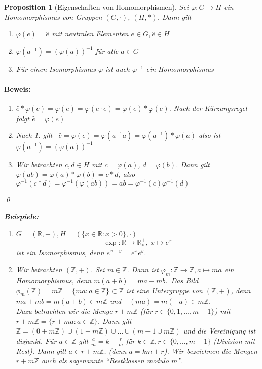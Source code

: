 \documentclass{report}
\newcommand{\R}{\mathbb{R}}
\newcommand{\Z}{\mathbb{Z}}
\theoremstyle{customrem}
\theoremstyle{customdef}
\newtheorem{proposition}[definition]{Proposition}
\renewenvironment{proof}{\paragraph{Beweis: }}{\qed}
\theoremstyle{customenv}
\begin{document}
	\begin{proposition}[Eigenschaften von Homomorphismen]
		Sei \(\varphi : G \to H\) ein Homomorphismus von Gruppen \((G, \cdot)\), \((H, \ast)\). Dann gilt
		\begin{enumerate}
			\itemsep0cm
			\item \(\varphi(e) = \hat{e}\) mit neutralen Elementen \(e \in G, \hat{e} \in H\)
			\item \(\varphi(a^{-1}) = (\varphi(a))^{-1}\) für alle \(a \in G\)
			\item Für einen Isomorphismus \(\varphi\) ist auch \(\varphi^{-1}\) ein Homomorphismus
		\end{enumerate}
		\begin{proof}
			\begin{enumerate}
				\item \(\hat{e} * \varphi(e) = \varphi(e) = \varphi(e \cdot e) = \varphi(e) * \varphi(e)\). Nach der Kürzungsregel folgt \(\hat{e} = \varphi(e)\)
				\item Nach 1. gilt \ \(\hat{e} = \varphi(e) = \varphi(a^{-1} a) = \varphi(a^{-1}) * \varphi(a)\) also ist \(\varphi(a^{-1}) = (\varphi(a))^{-1}\)
				\item Wir betrachten \(c, d \in H\) mit \(c = \varphi(a)\), \(d = \varphi(b)\). Dann gilt \(\varphi(a b) = \varphi(a) * \varphi(b) = c * d\), also \(\varphi^{-1}(c * d) = \varphi^{-1}(\varphi(a b)) = ab = \varphi^{-1}(c) \varphi^{-1}(d)\)
			\end{enumerate}
		\end{proof}

		\textbf{Beispiele:}
		\begin{enumerate}
			\item \(G = (\R, +), H = (\{x \in \R : x > 0\}, \cdot)\)
			\[\exp : \R \to \R^+_*,\ x \mapsto e^x\]
			ist ein Isomorphismus, denn \(e^{x + y} = e^x e^y\).
			\item Wir betrachten \((\Z, +)\). Sei \(m \in \Z\). Dann ist \(\varphi_m : \Z \to \Z, a \mapsto ma\) ein Homomorphismus, denn \(m(a + b) = ma + mb\).\ Das Bild \(\phi_m(\Z) = m\Z = \{m a : a \in \Z\} \subset \Z\)  ist eine Untergruppe von \((\Z, +)\), denn \(ma + mb = m(a + b) \in m\Z\) und \(-(ma) = m(-a) \in m\Z\).\\

			Dazu betrachten wir die Menge \(r + m\Z\) (für \(r \in \{0, 1, \dots, m-1\}\)) mit \(r + m\Z = \{r+ma : a \in \Z\}\). Dann gilt \(\Z = (0 +m\Z) \cup (1 + m\Z) \cup \dots \cup(m-1 \cup m\Z)\) und die Vereinigung ist disjunkt.	Für \(a \in \Z\) gilt \(\frac{a}{m} = k + \frac{r}{m}\) für \(k \in \Z, r \in \{0, \dots, m-1\}\) (Division mit Rest). Dann gilt \( a \in r + m\Z\). (denn \(a = km + r\)). Wir bezeichnen die Mengen \(r + m\Z\) auch als sogenannte "`\textit{Restklassen modulo \(m\)}"'.\\


\end{enumerate}
\end{proposition}
\end{document}
